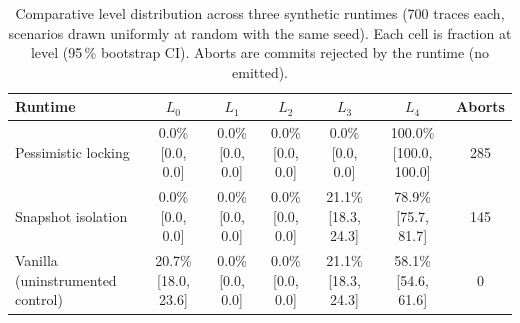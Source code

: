\begin{table}[t]
\centering
\caption{Comparative level distribution across three synthetic runtimes
(700 traces each, scenarios drawn uniformly at random with the same seed).
Each cell is fraction at level (95\,\% bootstrap CI). Aborts are commits
rejected by the runtime (no  emitted).}
\label{tab:baseline}
\small
\begin{tabular}{lcccccc}
\toprule
Runtime & $L_0$ & $L_1$ & $L_2$ & $L_3$ & $L_4$ & Aborts \\
\midrule
Pessimistic locking & 0.0\% [0.0, 0.0] & 0.0\% [0.0, 0.0] & 0.0\% [0.0, 0.0] & 0.0\% [0.0, 0.0] & 100.0\% [100.0, 100.0] & 285 \\
Snapshot isolation & 0.0\% [0.0, 0.0] & 0.0\% [0.0, 0.0] & 0.0\% [0.0, 0.0] & 21.1\% [18.3, 24.3] & 78.9\% [75.7, 81.7] & 145 \\
Vanilla (uninstrumented control) & 20.7\% [18.0, 23.6] & 0.0\% [0.0, 0.0] & 0.0\% [0.0, 0.0] & 21.1\% [18.3, 24.3] & 58.1\% [54.6, 61.6] & 0 \\
\bottomrule
\end{tabular}
\end{table}